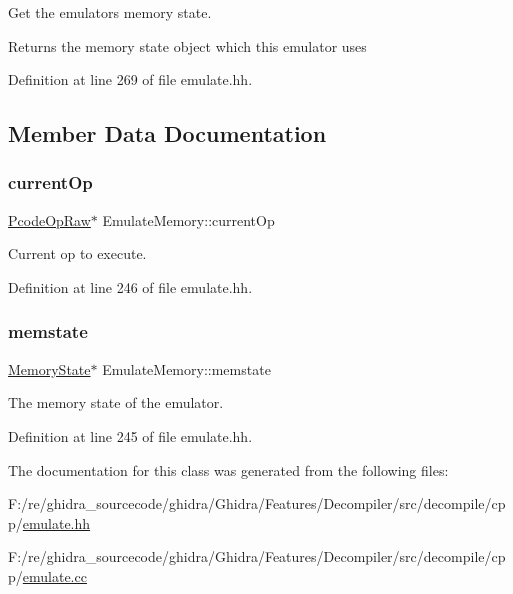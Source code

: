 Get the emulator\textquotesingle{}s memory state. 

\begin{DoxyReturn}{Returns}
the memory state object which this emulator uses 
\end{DoxyReturn}


Definition at line 269 of file emulate.\+hh.



\subsection{Member Data Documentation}
\mbox{\label{class_emulate_memory_a12495eafd8592e36d55308db9a999d67}} 
\subsubsection{\texorpdfstring{currentOp}{currentOp}}
{\footnotesize\ttfamily \mbox{\hyperlink{class_pcode_op_raw}{Pcode\+Op\+Raw}}$\ast$ Emulate\+Memory\+::current\+Op\hspace{0.3cm}{\ttfamily [protected]}}



Current op to execute. 



Definition at line 246 of file emulate.\+hh.

\mbox{\label{class_emulate_memory_a6ae15727f7c907169fc3df6f670afcfb}} 
\subsubsection{\texorpdfstring{memstate}{memstate}}
{\footnotesize\ttfamily \mbox{\hyperlink{class_memory_state}{Memory\+State}}$\ast$ Emulate\+Memory\+::memstate\hspace{0.3cm}{\ttfamily [protected]}}



The memory state of the emulator. 



Definition at line 245 of file emulate.\+hh.



The documentation for this class was generated from the following files\+:\begin{DoxyCompactItemize}
\item 
F\+:/re/ghidra\+\_\+sourcecode/ghidra/\+Ghidra/\+Features/\+Decompiler/src/decompile/cpp/\mbox{\hyperlink{emulate_8hh}{emulate.\+hh}}\item 
F\+:/re/ghidra\+\_\+sourcecode/ghidra/\+Ghidra/\+Features/\+Decompiler/src/decompile/cpp/\mbox{\hyperlink{emulate_8cc}{emulate.\+cc}}\end{DoxyCompactItemize}
